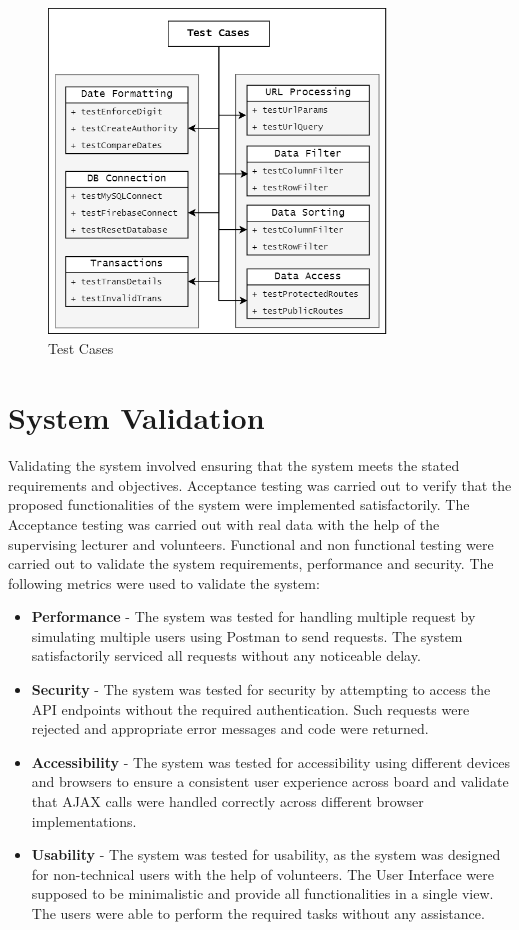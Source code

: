 \begin{figure}[H]
    \centering
    \includegraphics[width=0.8\textwidth]{images/test_cases.png}
    \caption{Test Cases}
    \label{image:test_cases}
\end{figure}

\section{System Validation}

Validating the system involved ensuring that the system meets the stated requirements and objectives. Acceptance testing was carried out to verify that the 
proposed functionalities of the system were implemented satisfactorily. The Acceptance testing was carried out with real data with the help of the supervising
lecturer and volunteers. Functional and non functional testing were carried out to validate the system requirements, performance and security. 
The following metrics were used to validate the system: 
\begin{itemize}
    \item \textbf{Performance} - The system was tested for handling multiple request by simulating multiple users using Postman to send requests. The system satisfactorily
    serviced all requests without any noticeable delay. 
    \item \textbf{Security} - The system was tested for security by attempting to access the API endpoints without the required authentication. Such requests were rejected
    and appropriate error messages and code were returned. 
    \item \textbf{Accessibility} - The system was tested for accessibility using different devices and browsers to ensure a consistent user experience across board and
    validate that AJAX calls were handled correctly across different browser implementations. 
    \item \textbf{Usability} - The system was tested for usability, as the system was designed for non-technical users with the help of volunteers. The User
    Interface were supposed to be minimalistic and provide all functionalities in a single view. The users were able to perform the required tasks without any assistance.
\end{itemize}

